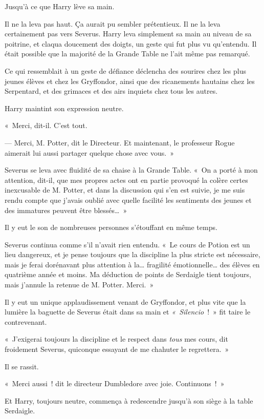 Jusqu'à ce que Harry lève sa main.

Il ne la leva pas haut.
Ça aurait pu sembler prétentieux.
Il ne la leva certainement pas vers Severus.
Harry leva simplement sa main au niveau de sa poitrine, et claqua doucement des doigts, un geste qui fut plus vu qu'entendu.
Il était possible que la majorité de la Grande Table ne l'ait même pas remarqué.

Ce qui ressemblait à un geste de défiance déclencha des sourires chez les plus jeunes élèves et chez les Gryffondor, ainsi que des ricanements hautains chez les Serpentard, et des grimaces et des airs inquiets chez tous les autres.

Harry maintint son expression neutre.

«~Merci, dit-il.
C'est tout.

--- Merci, M. Potter, dit le Directeur.
Et maintenant, le professeur Rogue aimerait lui aussi partager quelque chose avec vous.~»

Severus se leva avec fluidité de sa chaise à la Grande Table.
«~On a porté à mon attention, dit-il, que mes propres actes ont en partie provoqué la colère certes inexcusable de M. Potter, et dans la discussion qui s'en est suivie, je me suis rendu compte que j'avais oublié avec quelle facilité les sentiments des jeunes et des immatures peuvent être blessés…~»

Il y eut le son de nombreuses personnes s'étouffant en même temps.

Severus continua comme s'il n'avait rien entendu.
«~Le cours de Potion est un lieu dangereux, et je pense toujours que la discipline la plus stricte est nécessaire, mais je ferai dorénavant plus attention à la… fragilité émotionnelle… des élèves en quatrième année et moins.
Ma déduction de points de Serdaigle tient toujours, mais j'annule la retenue de M. Potter.
Merci.~»

Il y eut un unique applaudissement venant de Gryffondor, et plus vite que la lumière la baguette de Severus était dans sa main et \emph{«~Silencio}~!~»
fit taire le contrevenant.

«~J'exigerai toujours la discipline et le respect dans \emph{tous} mes cours, dit froidement Severus, quiconque essayant de me chahuter le regrettera.~»

Il se rassit.

«~Merci aussi~! dit le directeur Dumbledore avec joie.
Continuons~!~»

Et Harry, toujours neutre, commença à redescendre jusqu'à son siège à la table Serdaigle.

